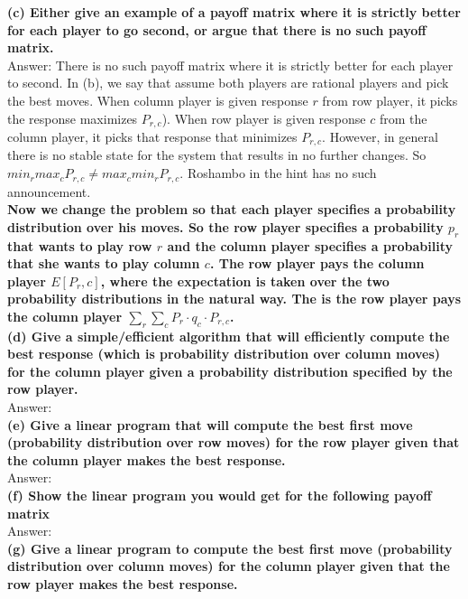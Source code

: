 \documentclass{article}
\begin{document}
\textbf{(c) Either give an example of a payoff matrix where it is strictly better for each player to go second, or argue that there is no such payoff matrix.} \\ \newline
Answer: There is no such payoff matrix where it is strictly better for each player to second. In (b), we say that assume both players are rational players and pick the best moves. When column player is given response $r$ from row player, it picks the response maximizes $P_{r,c}$). When row player is given response $c$ from the column player, it picks that response that minimizes $P_{r,c}$. However, in general there is no stable state for the system that results in no further changes. So $min_{r}max_{c}P_{r,c} \neq max_{c}min_{r}P_{r,c}$. Roshambo in the hint has no such announcement. \\\newline
\textbf{Now we change the problem so that each player specifies a probability distribution over his moves. So the row player specifies a probability $p_r$ that wants to play row $r$ and the column player specifies a probability  that she wants to play column $c$. The row player pays the column player $E[P_r,c]$, where the expectation is taken over the two probability distributions in the natural way. The is the row player pays the column player $\sum_r\sum_c P_r \cdot q_c \cdot P_{r,c}$.} \\ \newline
\textbf{(d) Give a simple/efficient algorithm that will efficiently compute the best response (which is probability distribution over column moves) for the column player given a probability distribution specified by the row player.} \\ \newline
Answer: \\ \newline
\textbf{(e) Give a linear program that will compute the best first move (probability distribution over row moves) for the row player given that the column player makes the best response.} \\ \newline
Answer: \\ \newline
\textbf{(f) Show the linear program you would get for the following payoff matrix} \\ \newline
Answer: \\ \newline
\textbf{(g) Give a linear program to compute the best first move (probability distribution over column moves) for the column player given that the row player makes the best response.} \\ \newline
\end{document}
